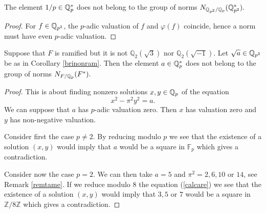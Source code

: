 \begin{lemma}
\notready\label{notnorm}
The element $1/p\in \mathbb{Q}_p^*$ does not belong to the group of norms $ N_{\mathbb{Q}_{p^2}/\mathbb{Q}_p}(\mathbb{Q}^*_{p^2}).$
\end{lemma}
\begin{proof}
For $f\in \mathbb{Q}_{p^2}$,   the $p$-adic valuation of $f$ and $\varphi (f)$ coincide, hence a norm must have even $p$-adic valuation.
\end{proof}

\begin{lemma}
\notready\label{notnormram}
Suppose that $F$ is ramified but it is not $\mathbb{Q}_2(\sqrt{3})$ nor  $\mathbb{Q}_2(\sqrt{-1})$. Let $\sqrt{a}\in \mathbb{Q}_{p^2}$ be as in Corollary \ref{brinonram}. Then the element $a \in \mathbb{Q}_p^*$ does not belong to the group of norms $ N_{F/\mathbb{Q}_p}(F^*).$
\end{lemma}
\begin{proof}
This is about finding nonzero solutions $ x,y \in \mathbb{Q}_p$ of the equation
\begin{equation}\label{calcare} x^2 -\pi^2 y ^2 = a. \end{equation}
We can suppose that    $a$ has $p$-adic valuation zero. Then $x$ has valuation zero and $y$ has non-negative valuation.

Consider first the case $p\neq 2$. By reducing modulo $p$ we see that the existence of a solution $(x,y)$ would imply that $a$ would be a square in $\mathbb{F}_p$  which gives a contradiction.

Consider now the case $p= 2$. We can then take $a=5$ and $\pi^2=2,6,10$ or $14$, see Remark \ref{remtame}. If we reduce modulo $8$ the  equation (\ref{calcare}) we see that the existence of a solution $(x,y)$ would imply that  $3,5$ or $7$ would be a square in $\mathbb{Z}/ 8 \mathbb{Z}$ which gives a contradiction.
\end{proof}





